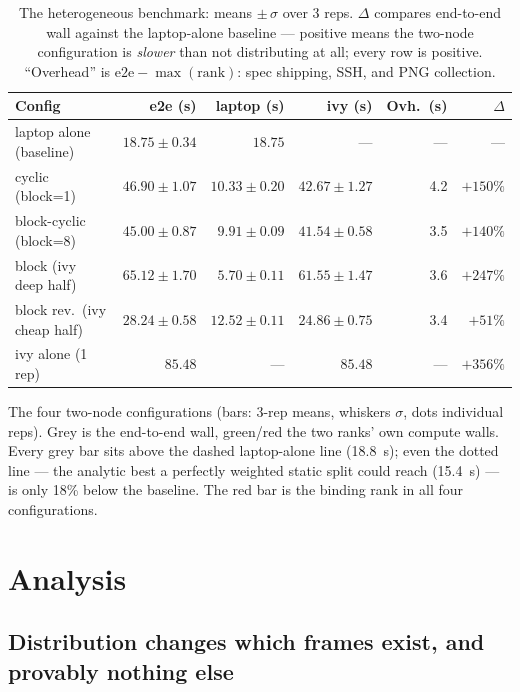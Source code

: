 \documentclass[
	english,
	letterpaper, oneside
]{article}
\begin{document}
\begin{table}[H]
\centering
\caption{The heterogeneous benchmark: means $\pm\,\sigma$ over 3 reps.
$\Delta$ compares end-to-end wall against the laptop-alone baseline ---
positive means the two-node configuration is \emph{slower} than not
distributing at all; every row is positive. ``Overhead'' is
$\mathrm{e2e} - \max(\mathrm{rank})$: spec shipping, SSH, and PNG
collection.\label{tab:bench}}
\small
\begin{tabular}{lrrrrr}
\toprule
Config & e2e (s) & laptop (s) & ivy (s) & Ovh.\ (s) & $\Delta$ \\
\midrule
laptop alone (baseline) & $\mathbf{18.75\pm0.34}$ & $18.75$ & --- & --- & --- \\
cyclic (block=1)        & $46.90\pm1.07$ & $10.33\pm0.20$ & $42.67\pm1.27$ & 4.2 & $+150\%$ \\
block-cyclic (block=8)  & $45.00\pm0.87$ & $9.91\pm0.09$  & $41.54\pm0.58$ & 3.5 & $+140\%$ \\
block (ivy deep half)   & $65.12\pm1.70$ & $5.70\pm0.11$  & $61.55\pm1.47$ & 3.6 & $+247\%$ \\
block rev.\ (ivy cheap half) & $28.24\pm0.58$ & $12.52\pm0.11$ & $24.86\pm0.75$ & 3.4 & $+51\%$ \\
ivy alone (1 rep)       & $85.48$ & --- & $85.48$ & --- & $+356\%$ \\
\bottomrule
\end{tabular}
\end{table}

            {The four two-node configurations (bars: 3-rep means, whiskers
             $\sigma$, dots individual reps). Grey is the end-to-end wall,
             green/red the two ranks' own compute walls. Every grey bar sits
             above the dashed laptop-alone line (18.8~s); even the dotted
             line --- the analytic best a perfectly weighted static split
             could reach (15.4~s) --- is only 18\% below the baseline. The
             red bar is the binding rank in all four configurations.
             \label{fig:bench}}

\section{Analysis}
\label{sec:analysis}

\subsection{Distribution changes which frames exist, and provably nothing else}
\label{sec:identity}
\end{document}
